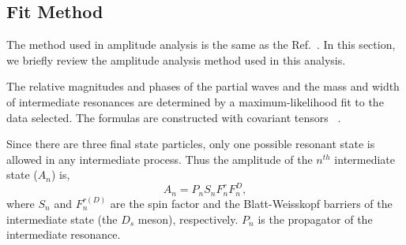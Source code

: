 \subsection{Fit Method}
\par{The method used in amplitude analysis is the same as the Ref.~\cite{Doc-DB-416-v30}. In this section, we briefly review the amplitude analysis method used in this analysis.
    
    The relative magnitudes and phases of the partial waves and the mass and width of intermediate resonances are determined by a maximum-likelihood fit to the data selected. The formulas are constructed with covariant tensors ~\cite{covariant-tensors}.

    Since there are three final state particles, only one possible resonant state is allowed in any intermediate process. Thus the amplitude of the $n^{th}$ intermediate state ($A_{n}$) is,
    \begin{equation}
        A_{n} = P_{n}S_{n}F_{n}^{r}F_{n}^{D}, \label{base-amplitude}
    \end{equation}
    where $S_{n}$ and $F_{n}^{r(D)}$ are the spin factor and the Blatt-Weisskopf barriers of the intermediate state (the $D_{s}$ meson), respectively. $P_{n}$ is the propagator of the intermediate resonance. 

}

